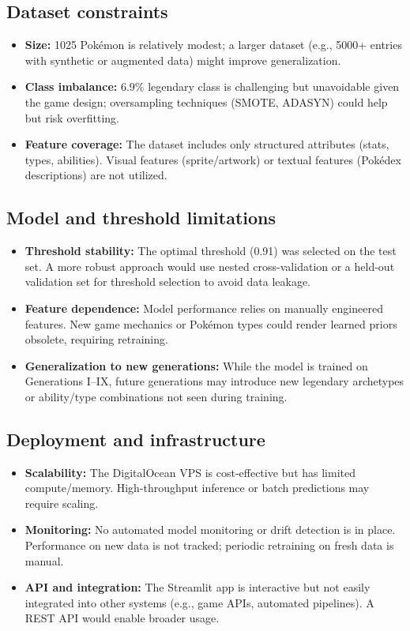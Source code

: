\subsection{Dataset constraints}

\begin{itemize}
  \item \textbf{Size:} 1025 Pokémon is relatively modest; a larger dataset (e.g., 5000+ entries with synthetic or augmented data) might improve generalization.
  \item \textbf{Class imbalance:} 6.9\% legendary class is challenging but unavoidable given the game design; oversampling techniques (SMOTE, ADASYN) could help but risk overfitting.
  \item \textbf{Feature coverage:} The dataset includes only structured attributes (stats, types, abilities). Visual features (sprite/artwork) or textual features (Pokédex descriptions) are not utilized.
\end{itemize}

\subsection{Model and threshold limitations}

\begin{itemize}
  \item \textbf{Threshold stability:} The optimal threshold (0.91) was selected on the test set. A more robust approach would use nested cross-validation or a held-out validation set for threshold selection to avoid data leakage.
  \item \textbf{Feature dependence:} Model performance relies on manually engineered features. New game mechanics or Pokémon types could render learned priors obsolete, requiring retraining.
  \item \textbf{Generalization to new generations:} While the model is trained on Generations I–IX, future generations may introduce new legendary archetypes or ability/type combinations not seen during training.
\end{itemize}

\subsection{Deployment and infrastructure}

\begin{itemize}
  \item \textbf{Scalability:} The DigitalOcean VPS is cost-effective but has limited compute/memory. High-throughput inference or batch predictions may require scaling.
  \item \textbf{Monitoring:} No automated model monitoring or drift detection is in place. Performance on new data is not tracked; periodic retraining on fresh data is manual.
  \item \textbf{API and integration:} The Streamlit app is interactive but not easily integrated into other systems (e.g., game APIs, automated pipelines). A REST API would enable broader usage.
\end{itemize}

